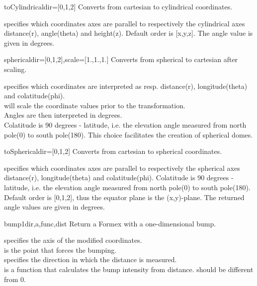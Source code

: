 {{\begin{methoddesc}  {toCylindrical}{dir=[0,1,2]}
Converts from cartesian to cylindrical coordinates.

 specifies which coordinates axes are parallel to respectively the cylindrical axes distance(r), angle(theta) and height(z). Default order is [x,y,z]. The angle value is given in degrees.
\end{methoddesc}

\begin{methoddesc}  {spherical}{dir=[0,1,2],scale=[1.,1.,1.]}
Converts from spherical to cartesian after scaling.

 specifies which coordinates are interpreted as resp. distance(r), longitude(theta) and colatitude(phi).\\
 will scale the coordinate values prior to the transformation.\\
Angles are then interpreted in degrees.\\
Colatitude is 90 degrees - latitude, i.e. the elevation angle measured from north pole(0) to south pole(180). This choice facilitates the creation of spherical domes.
\end{methoddesc}

\begin{methoddesc}  {toSpherical}{dir=[0,1,2]}
Converts from cartesian to spherical coordinates.

 specifies which coordinates axes are parallel to respectively the spherical axes distance(r), longitude(theta) and colatitude(phi). Colatitude is 90 degrees - latitude, i.e. the elevation angle measured from north pole(0) to south pole(180). Default order is [0,1,2], thus the equator plane is the (x,y)-plane. The returned angle values are given in degrees.
\end{methoddesc}

\begin{methoddesc}  {bump1}{dir,a,func,dist}
Return a Formex with a one-dimensional bump.

 specifies the axis of the modified coordinates.\\
 is the point that forces the bumping.\\
 specifies the direction in which the distance is measured.\\
 is a function that calculates the bump intensity from distance.  should be different from 0.
\end{methoddesc}

}}
